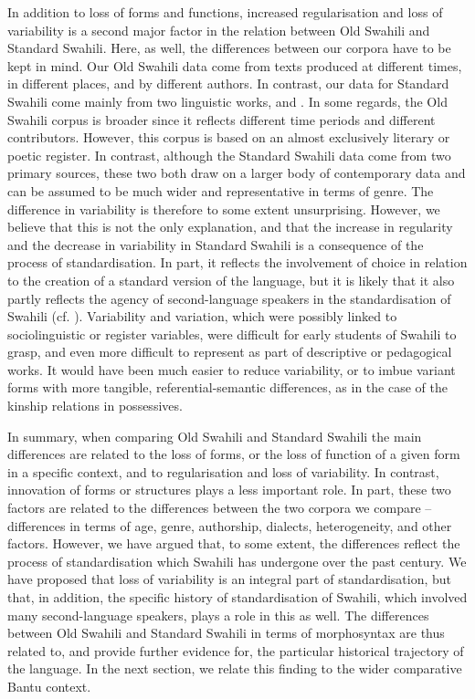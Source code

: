 \documentclass[output=paper]{langscibook}
\begin{document}
  In addition to loss of forms and functions, increased regularisation and loss of variability is a second major factor in the relation between Old Swahili and Standard Swahili. Here, as well, the differences between our corpora have to be kept in mind. Our Old Swahili data come from texts produced at different times, in different places, and by different authors. In contrast, our data for Standard Swahili come mainly from two linguistic works, \citet{Ashton1947} and \citet{Schadeberg1992}. In some regards, the Old Swahili corpus is broader since it reflects different time periods and different contributors. However, this corpus is based on an almost exclusively literary or poetic register. In contrast, although the Standard Swahili data come from two primary sources, these two both draw on a larger body of contemporary data and can be assumed to be much wider and representative in terms of genre. The difference in variability is therefore to some extent unsurprising. However, we believe that this is not the only explanation, and that the increase in regularity and the decrease in variability in Standard Swahili is a consequence of the process of standardisation. In part, it reflects the involvement of choice in relation to the creation of a standard version of the language, but it is likely that it also partly reflects the agency of second-language speakers in the standardisation of Swahili (cf. \citealt{Whiteley1969, Mlacha1995, Mazrui2007, Blommaert2014}). Variability and variation, which were possibly linked to sociolinguistic or register variables, were difficult for early students of Swahili to grasp, and even more difficult to represent as part of descriptive or pedagogical works. It would have been much easier to reduce variability, or to imbue variant forms with more tangible, referential-semantic differences, as in the case of the kinship relations in possessives. 

  In summary, when comparing Old Swahili and Standard Swahili the main differences are related to the loss of forms, or the loss of function of a given form in a specific context, and to regularisation and loss of variability. In contrast, innovation of forms or structures plays a less important role. In part, these two factors are related to the differences between the two corpora we compare -- differences in terms of age, genre, authorship, dialects, heterogeneity, and other factors. However, we have argued that, to some extent, the differences reflect the process of standardisation which Swahili has undergone over the past century. We have proposed that loss of variability is an integral part of standardisation, but that, in addition, the specific history of standardisation of Swahili, which involved many second-language speakers, plays a role in this as well. The differences between Old Swahili and Standard Swahili in terms of morphosyntax are thus related to, and provide further evidence for, the particular historical trajectory of the language. In the next section, we relate this finding to the wider comparative Bantu context. 
\end{document}
